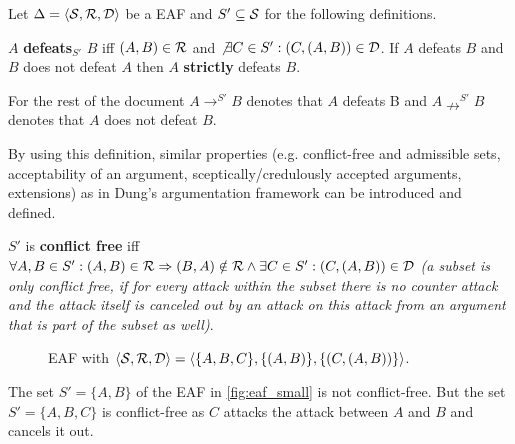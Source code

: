 Let $\Delta = \langle \S, \R, \D \rangle$ be a \gls{EAF} and $S' \subseteq \S$ for the following definitions.

\begin{definition}
$A$ \textbf{defeats$_{S'}$} $B$ iff $(A, B) \in \R$ and $\not \exists C \in S': (C, (A, B)) \in \D$. If $A$ defeats $B$ and $B$ does not defeat $A$ then $A$ \textbf{strictly} defeats $B$.
\end{definition}

\begin{notation}
For the rest of the document $A \rightarrow^{S'} B$ denotes that $A$ defeats B and $A \nrightarrow^{S'} B$ denotes that $A$ does not defeat $B$.
\end{notation}


By using this definition, similar properties (e.g. conflict-free and admissible sets, acceptability of an argument, sceptically/credulously accepted arguments, extensions) as in Dung's argumentation framework can be introduced and defined.

\begin{definition}
	$S'$ is \textbf{conflict free} iff $\forall A, B \in S': (A, B) \in \R \Rightarrow (B, A) \notin \R \wedge \exists C \in S': (C, (A, B)) \in \D$ \textit{(a subset is only conflict free, if for every attack within the subset there is no counter attack and the attack itself is canceled out by an attack on this attack from an argument that is part of the subset as well)}.
\end{definition}


\begin{figure}[h]
\centering
{}
\caption{\gls{EAF} with $\langle \S, \R, \D \rangle = \langle \{A, B, C\}, \{(A, B)\}, \{(C, (A, B))\} \rangle$.}
\label{fig:eaf_small}
\end{figure}

\begin{exa}
	The set $S' = \{A, B\}$ of the \gls{EAF} in \autoref{fig:eaf_small} is not conflict-free. But the set $S' = \{A, B, C\}$ is conflict-free as $C$ attacks the attack between $A$ and $B$ and cancels it out.
\end{exa}


